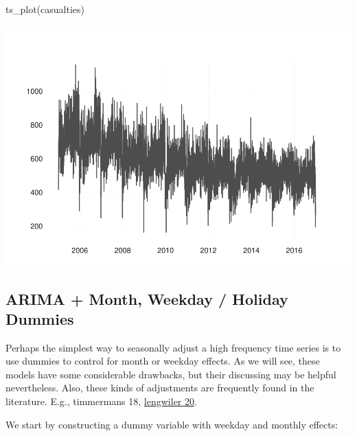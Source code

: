 \begin{Schunk}
\begin{Sinput}
ts_plot(casualties)
\end{Sinput}

\includegraphics[width=1\linewidth]{overview_files/figure-latex/unnamed-chunk-2-1} \end{Schunk}

\hypertarget{arima-month-weekday-holiday-dummies}{%
\subsection{ARIMA + Month, Weekday / Holiday
Dummies}\label{arima-month-weekday-holiday-dummies}}

Perhaps the simplest way to seasonally adjust a high frequency time
series is to use dummies to control for month or weekday effects. As we
will see, these models have some considerable drawbacks, but their
discussing may be helpful nevertheless. Also, these kinds of adjustments
are frequently found in the literature. E.g., timmermans 18,
\href{https://sjes.springeropen.com/articles/10.1186/s41937-020-00052-y}{lengwiler
20}.

We start by constructing a dummy variable with weekday and monthly
effects:

